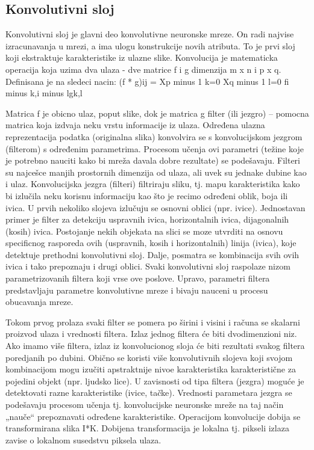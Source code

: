\documentclass[a4paper]{article}
\begin{document}
\subsection{Konvolutivni sloj}

Konvolutivni sloj je glavni deo konvolutivne neuronske mreze. On radi najvise izracunavanja u mrezi, a ima ulogu konstrukcije novih atributa. To je prvi sloj koji ekstraktuje karakteristike iz ulazne slike. Konvolucija je matematicka operacija koja uzima dva ulaza - dve matrice f i g dimenzija m x n i p x q. Definisana je na sledeci nacin:
(f * g)ij = Xp minus 1 k=0 Xq minus 1 l=0 fi minus k,i minus lgk,l

Matrica f je obicno ulaz, poput slike, dok je matrica g filter (ili jezgro) – pomocna matrica koja izdvaja neku vrstu informacije iz ulaza. Određena ulazna reprezentacija podatka (originalna slika) konvolvira se s konvolucijskom jezgrom (filterom) s određenim parametrima. Procesom učenja ovi parametri (težine koje je potrebno nauciti kako bi mreža davala dobre rezultate) se podešavaju. Filteri su najcešce manjih prostornih dimenzija od ulaza, ali uvek su jednake dubine kao i ulaz. Konvolucijska jezgra (filteri) filtriraju sliku, tj. mapu karakteristika kako bi izlučila neku korisnu informaciju kao što je recimo određeni oblik, boja ili ivica. U prvih nekoliko slojeva izlučuju se osnovni oblici (npr. ivice). Jednostavan primer je filter za detekciju uspravnih ivica, horizontalnih ivica, dijagonalnih (kosih) ivica. Postojanje nekih objekata na slici se moze utvrditi na osnovu specificnog rasporeda ovih (uspravnih, kosih i horizontalnih) linija (ivica), koje detektuje prethodni konvolutivni sloj. Dalje, posmatra se kombinacija svih ovih ivica i tako prepoznaju i drugi oblici. Svaki konvolutivni sloj raspolaze nizom parametrizovanih filtera koji vrse ove poslove. Upravo, parametri filtera predstavljaju parametre konvolutivne mreze i bivaju nauceni u procesu obucavanja mreze.

Tokom prvog prolaza svaki filter se pomera po širini i visini i računa se skalarni proizvod ulaza i vrednosti filtera. Izlaz jednog filtera će biti dvodimenzioni niz. Ako imamo više filtera, izlaz iz konvolucionog sloja će biti rezultati svakog filtera poredjanih po dubini. Obično se koristi više konvolutivnih slojeva koji svojom kombinacijom mogu izučiti apstraktnije nivoe karakteristika karakteristične za pojedini objekt (npr. ljudsko lice). U zavisnosti od tipa filtera (jezgra) moguće je detektovati razne karakteristike (ivice, tačke). Vrednosti parametara jezgra se podešavaju procesom učenja tj. konvolucijske neuronske mreže na taj način „nauče“ prepoznavati određene karakteristike. Operacijom konvolucije dobija se transformirana slika I*K. Dobijena transformacija je lokalna tj. pikseli izlaza zavise o lokalnom susedstvu piksela ulaza.
\end{document}
